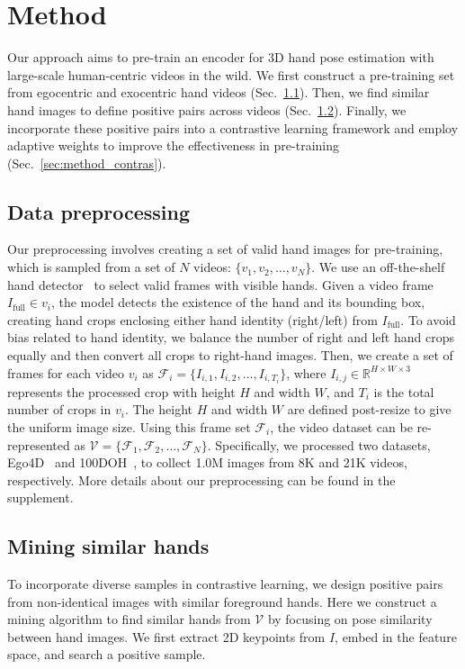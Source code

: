 \section{Method}
Our approach \Ours aims to pre-train an encoder for 3D hand pose estimation with large-scale human-centric videos in the wild. We first construct a pre-training set from egocentric and exocentric hand videos (Sec.~\ref{sec:method_preproc}). Then, we find similar hand images to define positive pairs across videos (Sec.~\ref{sec:method_simhand}). Finally, we incorporate these positive pairs into a contrastive learning framework and employ adaptive weights to improve the effectiveness in pre-training (Sec.~\ref{sec:method_contras}).

\subsection{Data preprocessing}\label{sec:method_preproc}
Our preprocessing involves creating a set of valid hand images for pre-training, which is sampled from a set of $N$ videos: $\{ v_1, v_2, \dots, v_N\}$. We use an off-the-shelf hand detector~\citep{shan:cvpr20} to select valid frames with visible hands. Given a video frame $I_{\textrm{full}}\in v_i$, the model detects the existence of the hand and its bounding box, creating hand crops enclosing either hand identity (right/left) from $I_{\textrm{full}}$. To avoid bias related to hand identity, we balance the number of right and left hand crops equally and then convert all crops to right-hand images. Then, we create a set of frames for each video $v_i$ as \( \mathcal{F}_i = \{ I_{i,1}, I_{i,2}, \dots, I_{i,T_{i}} \} \), where \( I_{i,j} \in \mathbb{R}^{H \times W \times 3} \) represents the processed crop with height \( H \) and width \( W \), and $T_i$ is the total number of crops in $v_i$. The height \( H \) and width \( W \) are defined post-resize to give the uniform image size. Using this frame set $\mathcal{F}_i$, the video dataset can be re-represented as $\mathcal{V} = \{ \mathcal{F}_1, \mathcal{F}_2, \dots, \mathcal{F}_N\}$. Specifically, we processed two datasets, Ego4D~\citep{grauman:cvpr22} and 100DOH~\citep{shan:cvpr20}, to collect 1.0M images from 8K and 21K videos, respectively. More details about our preprocessing can be found in the supplement.

\subsection{Mining similar hands}\label{sec:method_simhand}
To incorporate diverse samples in contrastive learning, we design positive pairs from non-identical images with similar foreground hands. Here we construct a mining algorithm to find similar hands from $\mathcal{V}$ by focusing on pose similarity between hand images. We first extract 2D keypoints from $I$, embed in the feature space, and search a positive sample.

